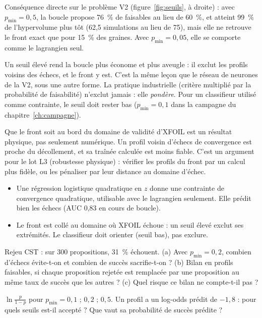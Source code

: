 Conséquence directe sur le problème V2 (figure~\ref{fig:seuils}, à droite) : avec $p_{\min}=0{,}5$, la boucle propose 76~\% de faisables au lieu de 60~\%, et atteint 99~\% de l'hypervolume plus tôt (62,5 simulations au lieu de 75), mais elle ne retrouve le front exact que pour 15~\% des graines. Avec $p_{\min}=0{,}05$, elle se comporte comme le lagrangien seul.

\begin{piege}
Un seuil élevé rend la boucle plus économe et plus aveugle : il exclut les profils voisins des échecs, et le front y est. C'est la même leçon que le réseau de neurones de la V2, sous une autre forme. La pratique industrielle (critère multiplié par la probabilité de faisabilité) n'exclut jamais : elle \emph{pondère}. Pour un classifieur utilisé comme contrainte, le seuil doit rester bas ($p_{\min}=0{,}1$ dans la campagne du chapitre~\ref{ch:campagne}).
\end{piege}

\begin{projet}
Que le front soit au bord du domaine de validité d'XFOIL est un résultat physique, pas seulement numérique. Un profil voisin d'échecs de convergence est proche du décollement, et sa traînée calculée est moins fiable. C'est un argument pour le lot L3 (robustesse physique) : vérifier les profils du front par un calcul plus fidèle, ou les pénaliser par leur distance au domaine d'échec.
\end{projet}

\begin{resultat}
\begin{itemize}
\item Une régression logistique quadratique en $z$ donne une contrainte de convergence quadratique, utilisable avec le lagrangien seulement. Elle prédit bien les échecs (AUC 0,83 en cours de boucle).
\item Le front est collé au domaine où XFOIL échoue : un seuil élevé exclut ses extrémités. Le classifieur doit orienter (seuil bas), pas exclure.
\end{itemize}
\end{resultat}

\exercices
\begin{exercice}\label{ex:clf-budget}
Rejeu CST : sur 300 propositions, 31~\% échouent. (a) Avec $p_{\min}=0{,}2$, combien d'échecs évite-t-on et combien de succès sacrifie-t-on ? (b) Bilan en profils faisables, si chaque proposition rejetée est remplacée par une proposition au même taux de succès que les autres ? (c) Quel risque ce bilan ne compte-t-il pas ?
\end{exercice}
\begin{exercice}\label{ex:clf-seuil}
$\ln\frac{p}{1-p}$ pour $p_{\min}=0{,}1$ ; $0{,}2$ ; $0{,}5$. Un profil a un log-odds prédit de $-1{,}8$ : pour quels seuils est-il accepté ? Que vaut sa probabilité de succès prédite ?
\end{exercice}


